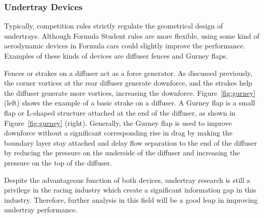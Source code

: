\subsubsection{Undertray Devices}
Typically, competition rules strictly regulate the geometrical design of undertrays. Although Formula Student rules are more flexible, using some kind of aerodynamic devices in Formula cars could slightly improve the performance. Examples of these kinds of devices are diffuser fences and Gurney flaps.

\noindent Fences or strakes on a diffuser act as a force generator. As discussed previously, the corner vortices at the rear diffuser generate downforce, and the strakes help the diffuser generate more vortices, increasing the downforce. Figure~\ref{fig:gurney} (left) shows the example of a basic strake on a diffuser. A Gurney flap is a small flap or L-shaped structure attached at the end of the diffuser, as shown in Figure~\ref{fig:gurney} (right). Generally, the Gurney flap is used to improve downforce without a significant corresponding rise in drag \cite{Willemsen2012CFD-basedDiffuser} by making the boundary layer stay attached and delay flow separation to the end of the diffuser by reducing the pressure on the underside of the diffuser and increasing the pressure on the top of the diffuser. 

\noindent Despite the advantageous function of both devices, undertray research is still a privilege in the racing industry which create a significant information gap in this industry. Therefore, further analysis in this field will be a good leap in improving undertray performance.  

